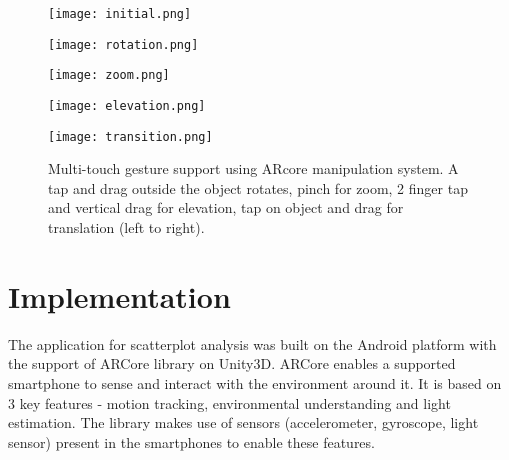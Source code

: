 \documentclass[journal]{vgtc}                %
\begin{document}
\begin{figure*}
\begin{multicols}{5}
    \begin{minipage}[b]{\linewidth}
    \texttt{[image: initial.png]}\par 
    \end{minipage}
    
    \begin{minipage}[b]{\linewidth}
    \texttt{[image: rotation.png]}\par 
    \end{minipage}
    
    \begin{minipage}[b]{\linewidth}
    \texttt{[image: zoom.png]}\par
    \end{minipage}
        
    \begin{minipage}[b]{\linewidth}
    \texttt{[image: elevation.png]}\par
    \end{minipage}
        \begin{minipage}[b]{\linewidth}
    \texttt{[image: transition.png]}\par
    \end{minipage}
\end{multicols}
\caption{Multi-touch gesture support using ARcore manipulation system. A tap and drag outside the object rotates, pinch for zoom, 2 finger tap and vertical drag for elevation, tap on object and drag for translation (left to right).}
\end{figure*}

\section{Implementation}

The application for scatterplot analysis was built on the Android platform with the support of ARCore library on Unity3D. ARCore enables a supported smartphone to sense and interact with the environment around it. It is based on 3 key features - motion tracking, environmental understanding and light estimation. The library makes use of sensors (accelerometer, gyroscope, light sensor) present in the smartphones to enable these features.
\end{document}
